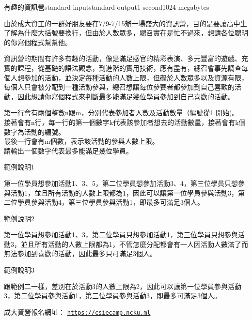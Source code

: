 \begin{problem}{有趣的資訊營}{standard input}{standard output}{1 second}{1024 megabytes}

\providecommand{\url}[1]{\underline{\texttt{#1}}}

由於成大資工的一群好朋友要在7/9-7/15辦一場盛大的資訊營，目的是要讓高中生了解為什麼大括號要換行，但由於人數眾多，總召實在是忙不過來，想請各位聰明的你寫個程式幫幫他。

資訊營的期間有許多有趣的活動，像是滿足感官的精彩表演、多元豐富的遊戲、充實的課程，從基礎的語法觀念，到進階的實用技術，應有盡有，總召會事先調查每個人想參加的活動，並決定每種活動的人數上限，但礙於人數眾多以及資源有限，每個人只會被分配到一種活動參與，總召想讓每位參賽者都參加到自己喜歡的活動，因此想請你寫個程式來判斷最多能滿足幾位學員參加到自己喜歡的活動。


\InputFile
第一行會有兩個整數n跟m，分別代表參加者人數及活動數量（編號從1 開始)。\\

接著會有n行，每一行的第一個數字k代表該參加者想去的活動數量，接著會有k個數字為活動的編號。\\

最後一行會有m個數，表示該活動的參與人數上限。\\


\OutputFile
請輸出一個數字代表最多能滿足幾位學員。

\Examples

\begin{example}
%
%
%
\end{example}

\Note
\large{範例說明1}

第一位學員想參加活動1、3、5，第二位學員想參加活動3、4，第三位學員只想參與活動1，並且所有活動的人數上限都為1，因此可以讓第一位學員參與活動3，第二位學員參與活動4，第三位學員參與活動1，即最多可滿足3個人。

\large{範例說明2}

第一位學員想參加活動1、3，第二位學員只想參加活動1，第三位學員只想參與活動3，並且所有活動的人數上限都為1，不管怎麼分配都會有一人因活動人數滿了而無法參加到喜歡的活動，因此最多只可滿足3個人。

\large{範例說明3}

跟範例二一樣，差別在於活動3的人數上限為2，因此可以讓第一位學員參與活動3，第二位學員參與活動1，第三位學員參與活動3，即最多可滿足3個人。

成大資營報名網址：
\url{https://csiecamp.ncku.ml}

\end{problem}

